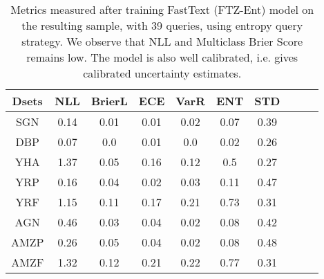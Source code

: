 \documentclass[11pt,a4paper]{article}
\begin{document}
\begin{table}[t]
\begin{center}
\small\addtolength{\tabcolsep}{-2pt}
\begin{tabular}{|c|c|c|c|c|c|c|c|c|c|}
\hline
Dsets & NLL & BrierL & ECE &  VarR & ENT & STD  \\ \hline
SGN & 0.14 &  0.01 & 0.01  & 0.02 & 0.07 & 0.39   \\ \hline
DBP  & 0.07 &  0.0 & 0.01 &  0.0 & 0.02 & 0.26 \\ \hline
YHA  & 1.37 &  0.05 & 0.16 &  0.12 & 0.5 & 0.27   \\ \hline
YRP  & 0.16 &  0.04 & 0.02  & 0.03 & 0.11 & 0.47 \\ \hline
YRF & 1.15 & 0.11 & 0.17 & 0.21 & 0.73 & 0.31 \\ \hline
AGN & 0.46 &  0.03 & 0.04 & 0.02 & 0.08 & 0.42 \\ \hline
AMZP & 0.26 &  0.05 & 0.04 & 0.02 & 0.08 & 0.48  \\ \hline
AMZF  & 1.32 & 0.12 & 0.21 & 0.22 & 0.77 & 0.31  \\ \hline
\end{tabular}
\caption{\label{font-table} Metrics measured after training FastText (FTZ-Ent) model on the resulting sample, with 39 queries, using entropy query strategy. We observe that NLL and Multiclass Brier Score remains low. The model is also well calibrated, i.e. gives calibrated uncertainty estimates.}
\label{tab:measures}
\end{center}
\end{table}
\end{document}
